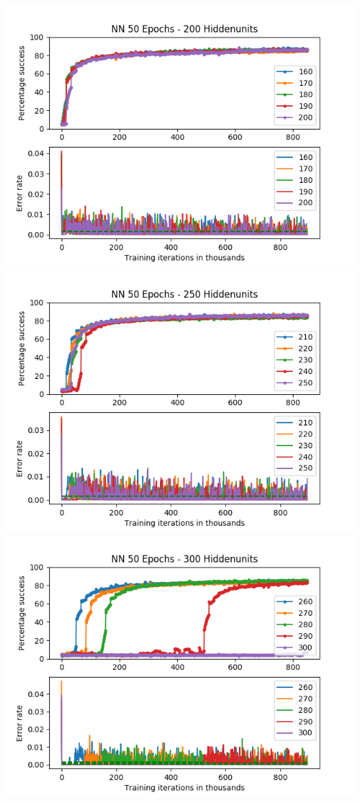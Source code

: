 \documentclass[11pt]{article}
\makeatletter
\def\maxwidth{\ifdim\Gin@nat@width>\linewidth\linewidth
    \else\Gin@nat@width\fi}
\let\Oldincludegraphics\includegraphics
\renewcommand{\includegraphics}[1]{\Oldincludegraphics[width=.8\maxwidth]{#1}}
\makeatother
\begin{document}
\includegraphics{50Epochs_Momentum_03_Experiment3/NN_50Epochs_200Hiddenunits.png}
\includegraphics{50Epochs_Momentum_03_Experiment3/NN_50Epochs_250Hiddenunits.png}
\includegraphics{50Epochs_Momentum_03_Experiment3/NN_50Epochs_300Hiddenunits.png}
\end{document}
